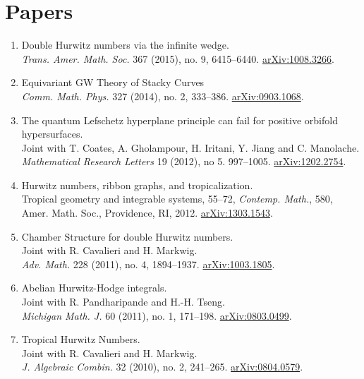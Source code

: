 \documentclass[11pt,letterpaper]{article}
\begin{document}
\section*{Papers }
\begin{enumerate}
\item Double Hurwitz numbers via the infinite wedge. \\
\emph{Trans. Amer. Math. Soc.} 367 (2015), no. 9, 6415--6440. \href{http://arxiv.org/abs/1008.3266}{arXiv:1008.3266}.

\item Equivariant GW Theory of Stacky Curves \\  \emph{Comm. Math. Phys.} 327 (2014), no. 2, 333--386. \href{http://arxiv.org/abs/0903.1068}{arXiv:0903.1068}.
\item The quantum Lefschetz hyperplane principle can fail for positive orbifold hypersurfaces. \\
 Joint with T. Coates, A. Gholampour, H. Iritani, Y. Jiang and C. Manolache. \\
   \emph{Mathematical Research Letters} 19 (2012), no 5. 997--1005.
\href{http://arxiv.org/abs/1202.2754}{arXiv:1202.2754}.
\item Hurwitz numbers, ribbon graphs, and tropicalization. \\ Tropical
  geometry and integrable systems, 55--72, \emph{Contemp. Math.}, 580,
  Amer. Math. Soc., Providence, RI, 2012.
\href{http://arxiv.org/abs/1303.1543}{arXiv:1303.1543}.
\item Chamber Structure for double Hurwitz numbers.
\\ Joint with R. Cavalieri and H. Markwig. \\ \emph{Adv. Math.} 228 (2011), no. 4,
  1894--1937.
\href{http://arxiv.org/abs/1003.1805}{arXiv:1003.1805}.
 \item Abelian Hurwitz-Hodge integrals. \\ 
Joint with R. Pandharipande and H.-H. Tseng.  \\  
\emph{Michigan Math. J.} 60 (2011), no. 1, 171--198.
\href{http://arxiv.org/abs/0803.0499}{arXiv:0803.0499}.
\item Tropical Hurwitz Numbers. \\
 Joint with R. Cavalieri and H. Markwig. \\
\emph{J. Algebraic Combin.} 32 (2010), no. 2, 241--265. 
\href{http://arxiv.org/abs/0804.0579}{arXiv:0804.0579}.


\end{enumerate}
\end{document}
